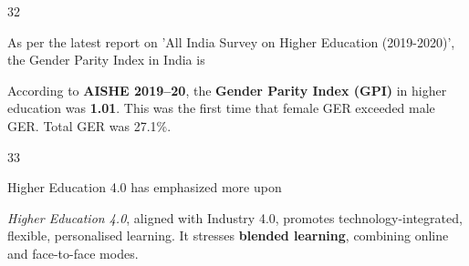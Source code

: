 \begin{question}{32}
{As per the latest report on 'All India Survey on Higher Education (2019-2020)', the Gender Parity Index in India is\par}
\begin{explain}
According to \textbf{AISHE 2019--20}, the \textbf{Gender Parity Index (GPI)} in higher education was \textbf{1.01}. This was the first time that female GER exceeded male GER. Total GER was 27.1\%.
\end{explain}
\end{question}

\begin{question}{33}
{Higher Education 4.0 has emphasized more upon\par}
\begin{explain}
\emph{Higher Education 4.0}, aligned with Industry 4.0, promotes technology-integrated, flexible, personalised learning. It stresses \textbf{blended learning}, combining online and face-to-face modes.
\end{explain}
\end{question}

